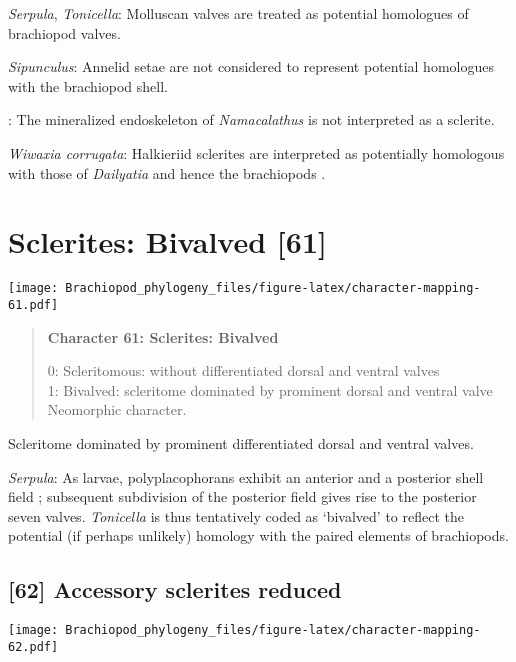 \documentclass[openany]{book}
\theoremstyle{definition}
\theoremstyle{definition}
\theoremstyle{definition}
\theoremstyle{remark}
\begin{document}
\hypertarget{Serpula-coding-60}{}
\emph{Serpula}, \emph{Tonicella}: Molluscan valves are treated as
potential homologues of brachiopod valves.

\hypertarget{Sipunculus-coding-60}{}
\emph{Sipunculus}: Annelid setae are not considered to represent
potential homologues with the brachiopod shell.

\hypertarget{TAXLABELS-coding-60}{}
: The mineralized endoskeleton of \emph{Namacalathus} is not interpreted
as a sclerite.

\hypertarget{Wiwaxia_corrugata-coding-60}{}
\emph{Wiwaxia corrugata}: Halkieriid sclerites are interpreted as
potentially homologous with those of \emph{Dailyatia} and hence the
brachiopods \citep{Zhao2017}.

\section{Sclerites: Bivalved {[}61{]}}\label{sclerites-bivalved-61}

\texttt{[image: Brachiopod\_phylogeny\_files/figure-latex/character-mapping-61.pdf]}

\begin{quote}
\textbf{Character 61: Sclerites: Bivalved}

0: Scleritomous: without differentiated dorsal and ventral valves\\
1: Bivalved: scleritome dominated by prominent dorsal and ventral
valve\\
Neomorphic character.
\end{quote}

Scleritome dominated by prominent differentiated dorsal and ventral
valves.

\hypertarget{Serpula-coding-61}{}
\emph{Serpula}: As larvae, polyplacophorans exhibit an anterior and a
posterior shell field \citep{Wanninger2002C}; subsequent subdivision of
the posterior field gives rise to the posterior seven valves.
\emph{Tonicella} is thus tentatively coded as `bivalved' to reflect the
potential (if perhaps unlikely) homology with the paired elements of
brachiopods.

\subsection*{{[}62{]} Accessory sclerites
reduced}\label{accessory-sclerites-reduced}

\texttt{[image: Brachiopod\_phylogeny\_files/figure-latex/character-mapping-62.pdf]}
\end{document}
